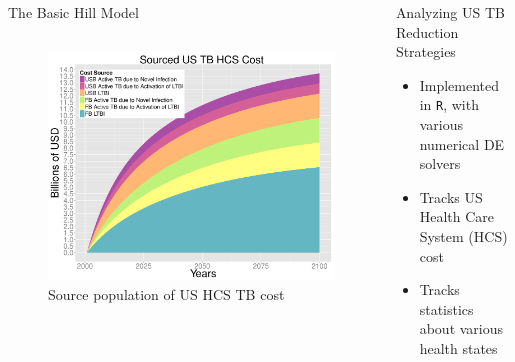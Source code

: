 \documentclass[final]{beamer}
\begin{document}
\begin{frame}
\begin{columns}[T]
\begin{column}{.3\textwidth}
\begin{block}{The Basic Hill Model}
\begin{columns}
\begin{column}{.47\textwidth}
\begin{figure}[h]
\begin{center}
                \includegraphics[width=\textwidth]{costPlotSourced2}
              \end{center}
              \caption{Source population of US HCS TB cost}
              \label{fig:incPlotTotal}
             \end{figure}
           \end{column}
         \end{columns}
       \end{block}
    \end{column}
    
    \begin{column}{.3\textwidth}
      \begin{block}{Analyzing US TB Reduction Strategies}
        \begin{itemize}
          \item Implemented in \texttt{R}, with various numerical DE solvers
          \item Tracks US Health Care System (HCS) cost
          \item Tracks statistics about various health states
        \end{itemize}
      \end{block}


\end{column}
\end{columns}
\end{frame}
\end{document}
